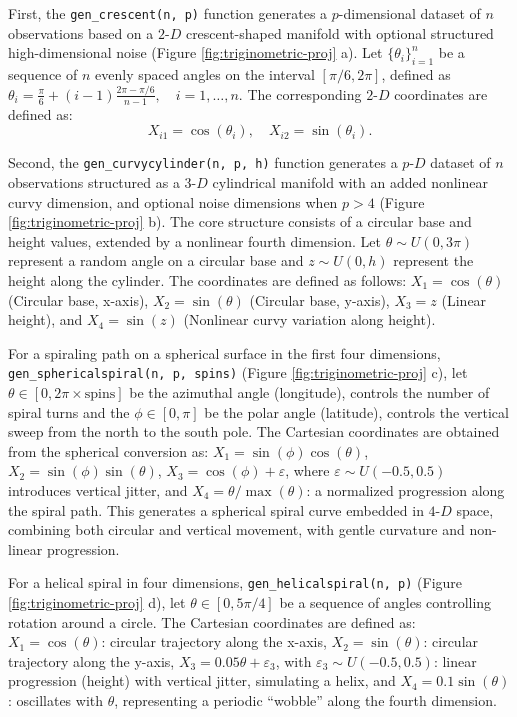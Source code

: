 First, the \texttt{gen\_crescent(n,\ p)} function generates a \(p\)-dimensional dataset of \(n\) observations based on a \(2\text{-}D\) crescent-shaped manifold with optional structured high-dimensional noise (Figure \ref{fig:triginometric-proj} a). Let \(\{\theta_i\}_{i=1}^n\) be a sequence of \(n\) evenly spaced angles on the interval \([\pi/6, 2\pi]\), defined as \(\theta_i = \frac{\pi}{6} + (i-1)\frac{2\pi - \pi/6}{n-1}, \quad i = 1,\dots,n\). The corresponding \(2\text{-}D\) coordinates are defined as: \[X_{i1} = \cos(\theta_i), \quad X_{i2} = \sin(\theta_i).\]

Second, the \texttt{gen\_curvycylinder(n,\ p,\ h)} function generates a \(p\text{-}D\) dataset of \(n\) observations structured as a \(3\text{-}D\) cylindrical manifold with an added nonlinear curvy dimension, and optional noise dimensions when \(p > 4\) (Figure \ref{fig:triginometric-proj} b). The core structure consists of a circular base and height values, extended by a nonlinear fourth dimension. Let \(\theta \sim U(0, 3\pi)\) represent a random angle on a circular base and \(z \sim U(0, h)\) represent the height along the cylinder. The coordinates are defined as follows: \(X_1 = \cos(\theta)\) (Circular base, x-axis), \(X_2 = \sin(\theta)\) (Circular base, y-axis), \(X_3 = z\) (Linear height), and \(X_4 = \sin(z)\) (Nonlinear curvy variation along height).

For a spiraling path on a spherical surface in the first four dimensions, \texttt{gen\_sphericalspiral(n,\ p,\ spins)} (Figure \ref{fig:triginometric-proj} c), let \(\theta \in [0, 2\pi \times \text{spins}]\) be the azimuthal angle (longitude), controls the number of spiral turns and the \(\phi \in [0, \pi]\) be the polar angle (latitude), controls the vertical sweep from the north to the south pole. The Cartesian coordinates are obtained from the spherical conversion as: \(X_1 = \sin(\phi)\cos(\theta)\), \(X_2 = \sin(\phi)\sin(\theta)\), \(X_3 = \cos(\phi) + \varepsilon\), where \(\varepsilon \sim U(-0.5, 0.5)\) introduces vertical jitter, and \(X_4 = \theta / \max(\theta)\): a normalized progression along the spiral path. This generates a spherical spiral curve embedded in \(4\text{-}D\) space, combining both circular and vertical movement, with gentle curvature and non-linear progression.

For a helical spiral in four dimensions, \texttt{gen\_helicalspiral(n,\ p)} (Figure \ref{fig:triginometric-proj} d), let \(\theta \in [0, 5\pi/4]\) be a sequence of angles controlling rotation around a circle. The Cartesian coordinates are defined as: \(X_1 = \cos(\theta)\): circular trajectory along the x-axis, \(X_2 = \sin(\theta)\): circular trajectory along the y-axis, \(X_3 = 0.05\theta + \varepsilon_3\), with \(\varepsilon_3 \sim U(-0.5, 0.5)\): linear progression (height) with vertical jitter, simulating a helix, and \(X_4 = 0.1\sin(\theta)\): oscillates with \(\theta\), representing a periodic ``wobble'' along the fourth dimension.


